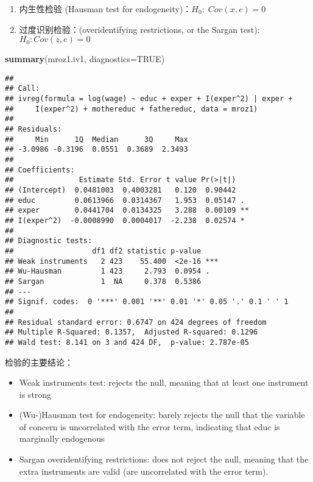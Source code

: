 \documentclass[
]{article}
\newenvironment{Shaded}{\begin{snugshade}}{\end{snugshade}}
\newcommand{\DataTypeTok}[1]{\textcolor[rgb]{0.13,0.29,0.53}{#1}}
\newcommand{\KeywordTok}[1]{\textcolor[rgb]{0.13,0.29,0.53}{\textbf{#1}}}
\newcommand{\NormalTok}[1]{#1}
\newcommand{\OtherTok}[1]{\textcolor[rgb]{0.56,0.35,0.01}{#1}}
\begin{document}
\begin{enumerate}
\def\labelenumi{\arabic{enumi}.}
\item
  内生性检验 (Hausman test for endogeneity)：\(H_{0}:\;Cov(x,e)=0\)
\item
  过度识别检验：(overidentifying restrictions, or the Sargan test):
  \(H_{0}:Cov(z,e)=0\)
\end{enumerate}

\begin{Shaded}
\begin{Highlighting}[]
\KeywordTok{summary}\NormalTok{(mroz1.iv1, }\DataTypeTok{diagnostics=}\OtherTok{TRUE}\NormalTok{)}
\end{Highlighting}
\end{Shaded}

\begin{verbatim}
## 
## Call:
## ivreg(formula = log(wage) ~ educ + exper + I(exper^2) | exper + 
##     I(exper^2) + mothereduc + fathereduc, data = mroz1)
## 
## Residuals:
##     Min      1Q  Median      3Q     Max 
## -3.0986 -0.3196  0.0551  0.3689  2.3493 
## 
## Coefficients:
##               Estimate Std. Error t value Pr(>|t|)   
## (Intercept)  0.0481003  0.4003281   0.120  0.90442   
## educ         0.0613966  0.0314367   1.953  0.05147 . 
## exper        0.0441704  0.0134325   3.288  0.00109 **
## I(exper^2)  -0.0008990  0.0004017  -2.238  0.02574 * 
## 
## Diagnostic tests:
##                  df1 df2 statistic p-value    
## Weak instruments   2 423    55.400  <2e-16 ***
## Wu-Hausman         1 423     2.793  0.0954 .  
## Sargan             1  NA     0.378  0.5386    
## ---
## Signif. codes:  0 '***' 0.001 '**' 0.01 '*' 0.05 '.' 0.1 ' ' 1
## 
## Residual standard error: 0.6747 on 424 degrees of freedom
## Multiple R-Squared: 0.1357,  Adjusted R-squared: 0.1296 
## Wald test: 8.141 on 3 and 424 DF,  p-value: 2.787e-05
\end{verbatim}

检验的主要结论：

\begin{itemize}
\item
  Weak instruments test: rejects the null, meaning that at least one
  instrument is strong
\item
  (Wu-)Hausman test for endogeneity: barely rejects the null that the
  variable of concern is uncorrelated with the error term, indicating
  that educ is marginally endogenous
\item
  Sargan overidentifying restrictions: does not reject the null, meaning
  that the extra instruments are valid (are uncorrelated with the error
  term).
\end{itemize}
\end{document}

